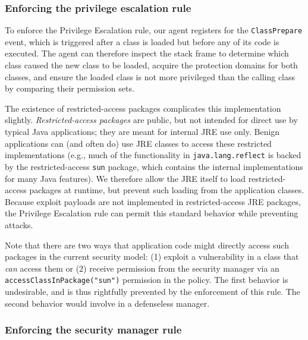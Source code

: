 \documentclass{sig-alternate}
\begin{document}
\subsubsection{Enforcing the privilege escalation rule}\label{sub:Enforcing-the-Privilege}


To enforce the Privilege Escalation rule, our agent registers for
the \texttt{ClassPrepare} event, which is triggered after a class is loaded but
before any of its code is executed.  The agent can therefore 
inspect the stack frame to determine which class
caused the new class to be loaded, acquire the protection
domains for both classes, and ensure the loaded class is not more privileged
than the calling class by comparing their permission sets. 

The existence of restricted-access packages complicates this implementation slightly. 
\textit{Restricted-access packages} are public, but not intended for direct
use by typical Java applications; they are meant for internal JRE
use only. 
%
Benign applications can (and often do) use JRE classes to access these
restricted implementations (e.g., much of the functionality in \texttt{java.lang.reflect}
is backed by the restricted-access \texttt{sun} package, which
contains the internal implementations
for many Java features).  We therefore allow the JRE itself to load restricted-access packages
at runtime, but prevent such loading from the application classes.
Because exploit payloads are not implemented in restricted-access JRE packages,
the Privilege Escalation rule can permit this standard behavior while preventing
attacks.  

Note that there are two ways that application code might directly access such
packages in the current security model: 
(1) exploit a vulnerability in a class that \emph{can} access them or (2)
receive permission from the security manager via an
\texttt{accessClassInPackage("sun")} permission in the policy.  The first behavior
is undesirable, and is thus rightfully prevented by the enforcement of this
rule.  The second behavior would involve in a defenseless manager. 


\subsubsection{Enforcing the security manager rule}\label{sub:Enforcing-the-SecurityManager}
\end{document}
